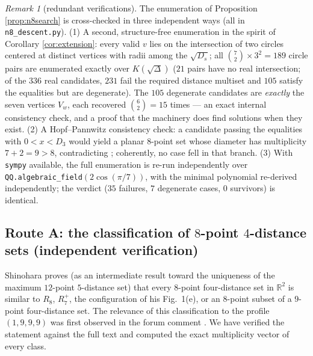 \documentclass[11pt]{article}
\theoremstyle{definition}
\theoremstyle{remark}
\newtheorem{remark}[theorem]{Remark}
\newcommand{\R}{\mathbb{R}}
\begin{document}
\begin{remark}[redundant verifications]\label{rem:n8redundant}
The enumeration of Proposition \ref{prop:n8search} is cross-checked in three
independent ways (all in \texttt{n8\_descent.py}). (1) A second, structure-free
enumeration in the spirit of Corollary \ref{cor:extension}: every valid $v$ lies on the
intersection of two circles centered at distinct vertices with radii among the
$\sqrt{D_s}$; all $\binom{7}{2} \times 3^2 = 189$ circle pairs are enumerated
exactly over $K(\sqrt{\Delta})$ ($21$ pairs have no real intersection; of the $336$
real candidates, $231$ fail the required distance multiset and $105$ satisfy the
equalities but are degenerate). The $105$ degenerate candidates are \emph{exactly} the
seven vertices $V_w$, each recovered $\binom{6}{2} = 15$ times --- an exact internal
consistency check, and a proof that the machinery does find solutions when they exist.
(2) A Hopf--Pannwitz consistency check: a candidate passing the equalities with
$0 < x < D_3$ would yield a planar $8$-point set whose diameter has multiplicity
$7 + 2 = 9 > 8$, contradicting \cite{HoPa34}; coherently, no case fell in that branch.
(3) With \texttt{sympy} available, the full enumeration is re-run independently over
\texttt{QQ.algebraic\_field}$(2\cos(\pi/7))$, with the minimal polynomial re-derived
independently; the verdict ($35$ failures, $7$ degenerate cases, $0$ survivors) is
identical.
\end{remark}

\subsection{Route A: the classification of $8$-point $4$-distance sets (independent
verification)}\label{sec:n8A}

Shinohara \cite[Theorem~1.2(a), p.~3049]{Shinohara08} proves (as an intermediate result
toward the uniqueness of the maximum $12$-point $5$-distance set) that every $8$-point
four-distance set in $\R^2$ is similar to $R_8$, $R_7^+$, the configuration of his
Fig.~1(e), or an $8$-point subset of a $9$-point four-distance set. The relevance of
this classification to the profile $(1,9,9,9)$ was first observed in the forum comment
\cite{Chojecki26}. We have verified the statement against the full text and computed
the exact multiplicity vector of every class.
\end{document}
